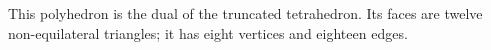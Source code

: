 This polyhedron is the dual of the truncated tetrahedron. Its faces are
twelve non-equilateral triangles; it has eight vertices and eighteen edges.